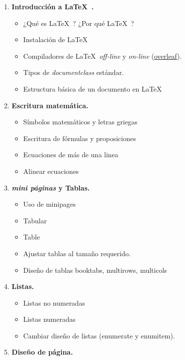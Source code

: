 \documentclass[11pt]{article}
\begin{document}
\begin{multicols}{2}
 \setlength{\columnseprule}{0.8pt} 
\begin{enumerate}[start=1,label={\bfseries \arabic*.},leftmargin=1cm]
    \item \textbf{Introducción a \LaTeX\ . }
        \begin{itemize}
            \item ¿Qué es \LaTeX\ ? ¿Por qué \LaTeX\ ?
            \item Instalación de \LaTeX\  
            \item Compiladores de \LaTeX\  \textit{off-line} y \textit{on-line}  (\href{www.overleaf.com}{overleaf}).
            \item Tipos de \textit{documentclass} estándar.
            \item Estructura básica de un documento en \LaTeX
        \end{itemize}
    \item \textbf{Escritura matemática.}
        \begin{itemize}
            \item Símbolos matemáticos y letras griegas
            \item Escritura de fórmulas y proposiciones
            \item Ecuaciones de más de una linea
            \item Alinear ecuaciones
        \end{itemize}
    \item \textbf{\textit{mini páginas} y Tablas.}
        \begin{itemize}
            \item Uso de minipages
            \item Tabular
            \item Table
            \item Ajustar tablas al tamaño requerido.
            \item Diseño de tablas booktabs, multirows, multicols
        \end{itemize}
    \item \textbf{Listas.} 
        \begin{itemize}
            \item Listas no numeradas
            \item Listas numeradas
            \item Cambiar diseño de listas (enumerate y enumitem).
        \end{itemize}
    \item \textbf{Diseño de página.}

\end{enumerate}
\end{multicols}
\end{document}
